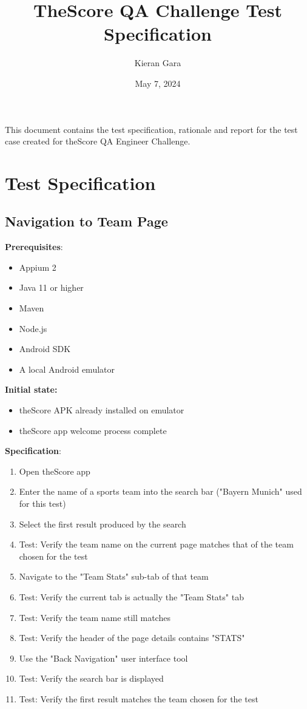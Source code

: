 \documentclass{article}
\title{TheScore QA Challenge Test Specification}
\author{Kieran Gara}
\date{May 7, 2024}
\begin{document}
\maketitle

This document contains the test specification, rationale and report for the test case created for theScore QA Engineer Challenge.

\section{Test Specification}
\subsection{Navigation to Team Page}
\textbf{Prerequisites}:

\begin{itemize}
    \item Appium 2
    \item Java 11 or higher
    \item Maven
    \item Node.js
    \item Android SDK
    \item A local Android emulator
\end{itemize}
\textbf{Initial state:}
\begin{itemize}
    \item theScore APK already installed on emulator
    \item theScore app welcome process complete
\end{itemize}

\noindent\textbf{Specification}:

\begin{enumerate}
    \item Open theScore app
    \item Enter the name of a sports team into the search bar ("Bayern Munich" used for this test)
    \item Select the first result produced by the search
    \item Test: Verify the team name on the current page matches that of the team chosen for the test
    \item Navigate to the "Team Stats" sub-tab of that team
    \item Test: Verify the current tab is actually the "Team Stats" tab
    \item Test: Verify the team name still matches
    \item Test: Verify the header of the page details contains "STATS"
    \item Use the "Back Navigation" user interface tool
    \item Test: Verify the search bar is displayed
    \item Test: Verify the first result matches the team chosen for the test
\end{enumerate}
\end{document}
